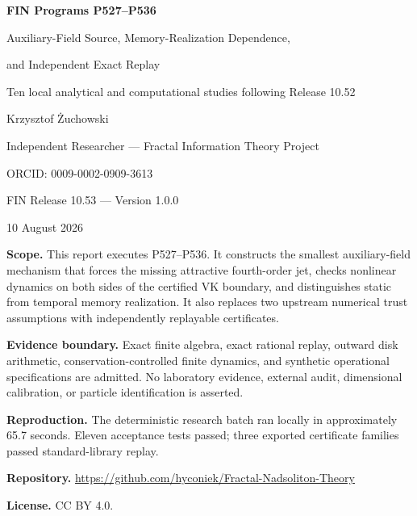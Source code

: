 \documentclass[11pt,a4paper]{article}
\begin{document}
\begin{titlepage}
\centering
\vspace*{1.8cm}
{\LARGE\bfseries FIN Programs P527--P536\par}
\vspace{0.7cm}
{\Large Auxiliary-Field Source, Memory-Realization Dependence,\par and Independent Exact Replay\par}
\vspace{0.5cm}
{\large Ten local analytical and computational studies following Release 10.52\par}
\vspace{1.5cm}
{\Large Krzysztof Żuchowski\par}
\vspace{0.3cm}
{\large Independent Researcher --- Fractal Information Theory Project\par}
{\large ORCID: 0009-0002-0909-3613\par}
\vspace{1.3cm}
{\large FIN Release 10.53 --- Version 1.0.0\par}
{\large 10 August 2026\par}
\vfill
\begin{minipage}{0.84\textwidth}
\textbf{Scope.} This report executes P527--P536. It constructs the smallest auxiliary-field mechanism that forces the missing attractive fourth-order jet, checks nonlinear dynamics on both sides of the certified VK boundary, and distinguishes static from temporal memory realization. It also replaces two upstream numerical trust assumptions with independently replayable certificates.\par
\textbf{Evidence boundary.} Exact finite algebra, exact rational replay, outward disk arithmetic, conservation-controlled finite dynamics, and synthetic operational specifications are admitted. No laboratory evidence, external audit, dimensional calibration, or particle identification is asserted.\par
\textbf{Reproduction.} The deterministic research batch ran locally in approximately 65.7 seconds. Eleven acceptance tests passed; three exported certificate families passed standard-library replay.\par
\textbf{Repository.} \url{https://github.com/hyconiek/Fractal-Nadsoliton-Theory}\par
\textbf{License.} CC BY 4.0.
\end{minipage}
\end{titlepage}
\end{document}
